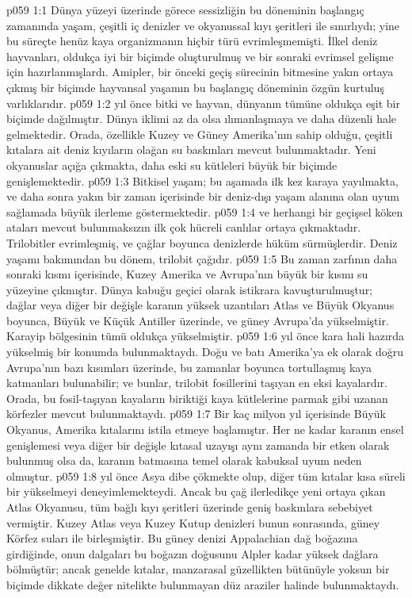\vs p059 1:1 Dünya yüzeyi üzerinde görece sessizliğin bu döneminin başlangıç zamanında yaşam, çeşitli iç denizler ve okyanussal kıyı şeritleri ile sınırlıydı; yine bu süreçte henüz kaya organizmanın hiçbir türü evrimleşmemişti. İlkel deniz hayvanları, oldukça iyi bir biçimde oluşturulmuş ve bir sonraki evrimsel gelişme için hazırlanmışlardı. Amipler, bir önceki geçiş sürecinin bitmesine yakın ortaya çıkmış bir biçimde hayvansal yaşamın bu başlangıç döneminin özgün kurtuluş varlıklarıdır.
\vs p059 1:2  yıl önce bitki ve hayvan, dünyanın tümüne oldukça eşit bir biçimde dağılmıştır. Dünya iklimi az da olsa ılımanlaşmaya ve daha düzenli hale gelmektedir. Orada, özellikle Kuzey ve Güney Amerika’nın sahip olduğu, çeşitli kıtalara ait deniz kıyıların olağan su baskınları mevcut bulunmaktadır. Yeni okyanuslar açığa çıkmakta, daha eski su kütleleri büyük bir biçimde genişlemektedir.
\vs p059 1:3 Bitkisel yaşam; bu aşamada ilk kez karaya yayılmakta, ve daha sonra yakın bir zaman içerisinde bir deniz\hyp{}dışı yaşam alanına olan uyum sağlamada büyük ilerleme göstermektedir.
\vs p059 1:4  ve herhangi bir geçişsel köken ataları mevcut bulunmaksızın ilk çok hücreli canlılar ortaya çıkmaktadır. Trilobitler evrimleşmiş, ve çağlar boyunca denizlerde hüküm sürmüşlerdir. Deniz yaşamı bakımından bu dönem, trilobit çağıdır.
\vs p059 1:5 Bu zaman zarfının daha sonraki kısmı içerisinde, Kuzey Amerika ve Avrupa’nın büyük bir kısmı su yüzeyine çıkmıştır. Dünya kabuğu geçici olarak istikrara kavuşturulmuştur; dağlar veya diğer bir değişle karanın yüksek uzantıları Atlas ve Büyük Okyanus boyunca, Büyük ve Küçük Antiller üzerinde, ve güney Avrupa’da yükselmiştir. Karayip bölgesinin tümü oldukça yükselmiştir.
\vs p059 1:6  yıl önce kara hali hazırda yükselmiş bir konumda bulunmaktaydı. Doğu ve batı Amerika’ya ek olarak doğru Avrupa’nın bazı kısımları üzerinde, bu zamanlar boyunca tortullaşmış kaya katmanları bulunabilir; ve bunlar, trilobit fosillerini taşıyan en eksi kayalardır. Orada, bu fosil\hyp{}taşıyan kayaların biriktiği kaya kütlelerine parmak gibi uzanan körfezler mevcut bulunmaktaydı.
\vs p059 1:7 Bir kaç milyon yıl içerisinde Büyük Okyanus, Amerika kıtalarını istila etmeye başlamıştır. Her ne kadar karanın ensel genişlemesi veya diğer bir değişle kıtasal uzayışı aynı zamanda bir etken olarak bulunmuş olsa da, karanın batmasına temel olarak kabuksal uyum neden olmuştur.
\vs p059 1:8  yıl önce Asya dibe çökmekte olup, diğer tüm kıtalar kısa süreli bir yükselmeyi deneyimlemekteydi. Ancak bu çağ ilerledikçe yeni ortaya çıkan Atlas Okyanusu, tüm bağlı kıyı şeritleri üzerinde geniş baskınlara sebebiyet vermiştir. Kuzey Atlas veya Kuzey Kutup denizleri bunun sonrasında, güney Körfez suları ile birleşmiştir. Bu güney denizi Appalachian dağ boğazına girdiğinde, onun dalgaları bu boğazın doğusunu Alpler kadar yüksek dağlara bölmüştür; ancak genelde kıtalar, manzarasal güzellikten bütünüyle yoksun bir biçimde dikkate değer nitelikte bulunmayan düz araziler halinde bulunmaktaydı.

